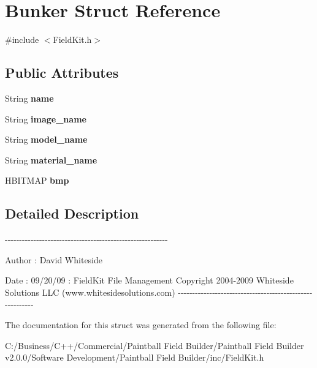 \hypertarget{struct_bunker}{
\section{Bunker Struct Reference}
\label{struct_bunker}
}


{\ttfamily \#include $<$FieldKit.h$>$}\subsection*{Public Attributes}
\begin{DoxyCompactItemize}
\item 
\hypertarget{struct_bunker_a246916f4dd1773cafda66b4a7438385a}{
String {\bfseries name}}
\label{struct_bunker_a246916f4dd1773cafda66b4a7438385a}

\item 
\hypertarget{struct_bunker_aa2dcdc7af3210a6fc7060f93b103d4c5}{
String {\bfseries image\_\-name}}
\label{struct_bunker_aa2dcdc7af3210a6fc7060f93b103d4c5}

\item 
\hypertarget{struct_bunker_a632bb29865af4ae84b7827eddf1747ef}{
String {\bfseries model\_\-name}}
\label{struct_bunker_a632bb29865af4ae84b7827eddf1747ef}

\item 
\hypertarget{struct_bunker_a2f5aeaf83d3dc440b805a76e99926f96}{
String {\bfseries material\_\-name}}
\label{struct_bunker_a2f5aeaf83d3dc440b805a76e99926f96}

\item 
\hypertarget{struct_bunker_a4c92a2f1536e7a416066d6b2cf48356a}{
HBITMAP {\bfseries bmp}}
\label{struct_bunker_a4c92a2f1536e7a416066d6b2cf48356a}

\end{DoxyCompactItemize}


\subsection{Detailed Description}
-\/-\/-\/-\/-\/-\/-\/-\/-\/-\/-\/-\/-\/-\/-\/-\/-\/-\/-\/-\/-\/-\/-\/-\/-\/-\/-\/-\/-\/-\/-\/-\/-\/-\/-\/-\/-\/-\/-\/-\/-\/-\/-\/-\/-\/-\/-\/-\/-\/-\/-\/-\/-\/-\/-\/-\/-\/ \begin{DoxyAuthor}{Author}
: David Whiteside 
\end{DoxyAuthor}
\begin{DoxyDate}{Date}
: 09/20/09 : FieldKit File Management Copyright 2004-\/2009 Whiteside Solutions LLC (www.whitesidesolutions.com) -\/-\/-\/-\/-\/-\/-\/-\/-\/-\/-\/-\/-\/-\/-\/-\/-\/-\/-\/-\/-\/-\/-\/-\/-\/-\/-\/-\/-\/-\/-\/-\/-\/-\/-\/-\/-\/-\/-\/-\/-\/-\/-\/-\/-\/-\/-\/-\/-\/-\/-\/-\/-\/-\/-\/-\/-\/ 
\end{DoxyDate}


The documentation for this struct was generated from the following file:\begin{DoxyCompactItemize}
\item 
C:/Business/C++/Commercial/Paintball Field Builder/Paintball Field Builder v2.0.0/Software Development/Paintball Field Builder/inc/FieldKit.h\end{DoxyCompactItemize}

